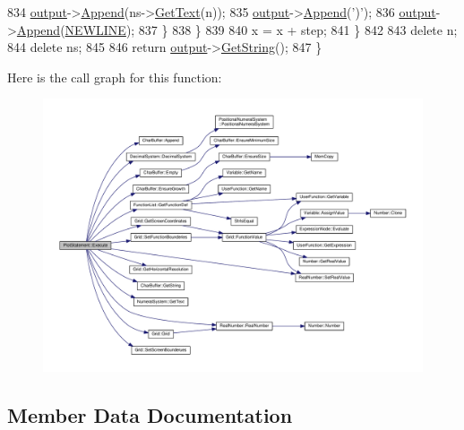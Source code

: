 \begin{DoxyCode}
834                 \hyperlink{classSyntaxNode_a1180628cbe3fce43930cee0df5a9ce5c}{output}->\hyperlink{classCharBuffer_a045b38735f7b3007c1b98d3d7b7feafe}{Append}(ns->\hyperlink{classNumeralSystem_a74dc91c4dbab4a88a123b2a32753f485}{GetText}(n));
835                 \hyperlink{classSyntaxNode_a1180628cbe3fce43930cee0df5a9ce5c}{output}->\hyperlink{classCharBuffer_a045b38735f7b3007c1b98d3d7b7feafe}{Append}(\textcolor{charliteral}{')'});
836                 \hyperlink{classSyntaxNode_a1180628cbe3fce43930cee0df5a9ce5c}{output}->\hyperlink{classCharBuffer_a045b38735f7b3007c1b98d3d7b7feafe}{Append}(\hyperlink{platform_8h_a806511f4930171733227c99101dc0606}{NEWLINE});
837             \}
838         \}
839 
840         x = x + step;
841     \}
842 
843     \textcolor{keyword}{delete} n;
844     \textcolor{keyword}{delete} ns;
845 
846     \textcolor{keywordflow}{return} \hyperlink{classSyntaxNode_a1180628cbe3fce43930cee0df5a9ce5c}{output}->\hyperlink{classCharBuffer_a7dfd3feaaf80f318ba44efe15b1ec44b}{GetString}();
847 \}
\end{DoxyCode}


Here is the call graph for this function\+:\nopagebreak
\begin{figure}[H]
\begin{center}
\leavevmode
\includegraphics[width=350pt]{classPlotStatement_a653ff64c2c918b3209be426f7c243459_cgraph}
\end{center}
\end{figure}




\subsection{Member Data Documentation}
